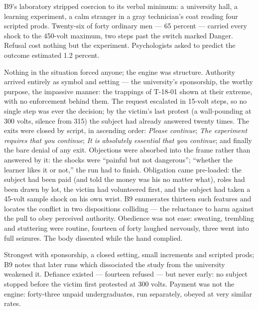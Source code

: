 \begin{core}
B9's laboratory stripped coercion to its verbal minimum: a university hall, a learning experiment, a calm stranger in a gray technician's coat reading four scripted prods. Twenty-six of forty ordinary men --- 65 percent --- carried every shock to the 450-volt maximum, two steps past the switch marked Danger. Refusal cost nothing but the experiment. Psychologists asked to predict the outcome estimated 1.2 percent.
\end{core}
\begin{mechanism}
Nothing in the situation forced anyone; the engine was structure. Authority arrived entirely as symbol and setting --- the university's sponsorship, the worthy purpose, the impassive manner: the trappings of T-18-01 shown at their extreme, with no enforcement behind them. The request escalated in 15-volt steps, so no single step was ever the decision; by the victim's last protest (a wall-pounding at 300 volts, silence from 315) the subject had already answered twenty times. The exits were closed by script, in ascending order: \emph{Please continue}; \emph{The experiment requires that you continue}; \emph{It is absolutely essential that you continue}; and finally the bare denial of any exit. Objections were absorbed into the frame rather than answered by it: the shocks were ``painful but not dangerous''; ``whether the learner likes it or not,'' the run had to finish. Obligation came pre-loaded: the subject had been paid (and told the money was his no matter what), roles had been drawn by lot, the victim had volunteered first, and the subject had taken a 45-volt sample shock on his own wrist. B9 enumerates thirteen such features and locates the conflict in two dispositions colliding --- the reluctance to harm against the pull to obey perceived authority. Obedience was not ease: sweating, trembling and stuttering were routine, fourteen of forty laughed nervously, three went into full seizures. The body dissented while the hand complied.
\end{mechanism}
\begin{conditions}
Strongest with sponsorship, a closed setting, small increments and scripted prods; B9 notes that later runs which dissociated the study from the university weakened it. Defiance existed --- fourteen refused --- but never early: no subject stopped before the victim first protested at 300 volts. Payment was not the engine: forty-three unpaid undergraduates, run separately, obeyed at very similar rates.
\end{conditions}
